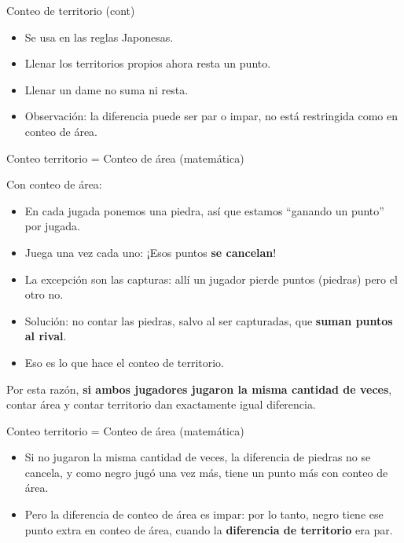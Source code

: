 \documentclass{beamer}
\begin{document}
\begin{frame}{Conteo de territorio (cont)}
  
  \begin{itemize}
    \item Se usa en las reglas Japonesas.
    \item Llenar los territorios propios ahora resta un punto.
    \item Llenar un dame no suma ni resta.
    \item Observación: la diferencia puede ser par o impar, no está restringida como en conteo de área.
  \end{itemize}
  
\end{frame}


\begin{frame}{Conteo territorio = Conteo de área (matemática)}
  
  Con conteo de área:
  \begin{itemize}
    \item En cada jugada ponemos una piedra, así que estamos ``ganando un punto'' por jugada.
    \item Juega una vez cada uno: ¡Esos puntos \textbf{se cancelan}!
    \item La excepción son las capturas: allí un jugador pierde puntos (piedras) pero el otro no.
    \item Solución: no contar las piedras, salvo al ser capturadas, que \textbf{suman puntos al rival}.
    \item Eso es lo que hace el conteo de territorio.
  \end{itemize}
  
  Por esta razón, \textbf{si ambos jugadores jugaron la misma cantidad de veces}, contar área y contar territorio dan exactamente igual diferencia.
  
\end{frame}


\begin{frame}{Conteo territorio = Conteo de área (matemática)}
  
  \begin{itemize}
      \item Si no jugaron la misma cantidad de veces, la diferencia de piedras no se cancela, y como negro jugó una vez más, tiene un punto más con conteo de área. 
  \end{itemize}
  
  \begin{itemize}
      \item Pero la diferencia de conteo de área es impar: por lo tanto, negro tiene ese punto extra en conteo de área, cuando la \textbf{diferencia de territorio} era par.
  \end{itemize}
\end{frame}
\end{document}
